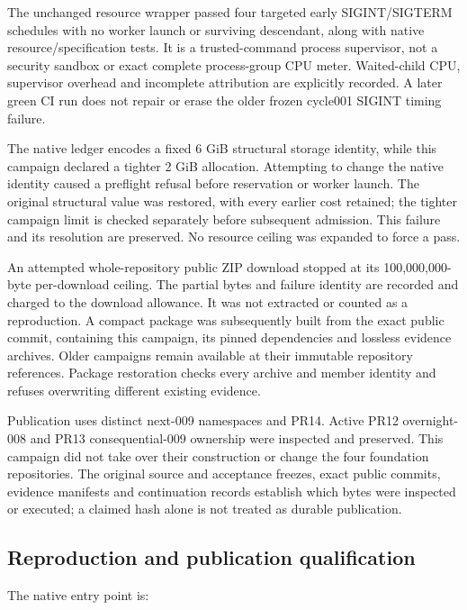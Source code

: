\documentclass[
  11pt,
]{article}
\begin{document}
The unchanged resource wrapper passed four targeted early SIGINT/SIGTERM
schedules with no worker launch or surviving descendant, along with
native resource/specification tests. It is a trusted-command process
supervisor, not a security sandbox or exact complete process-group CPU
meter. Waited-child CPU, supervisor overhead and incomplete attribution
are explicitly recorded. A later green CI run does not repair or erase
the older frozen cycle001 SIGINT timing failure.

The native ledger encodes a fixed 6 GiB structural storage identity,
while this campaign declared a tighter 2 GiB allocation. Attempting to
change the native identity caused a preflight refusal before reservation
or worker launch. The original structural value was restored, with every
earlier cost retained; the tighter campaign limit is checked separately
before subsequent admission. This failure and its resolution are
preserved. No resource ceiling was expanded to force a pass.

An attempted whole-repository public ZIP download stopped at its
100,000,000-byte per-download ceiling. The partial bytes and failure
identity are recorded and charged to the download allowance. It was not
extracted or counted as a reproduction. A compact package was
subsequently built from the exact public commit, containing this
campaign, its pinned dependencies and lossless evidence archives. Older
campaigns remain available at their immutable repository references.
Package restoration checks every archive and member identity and refuses
overwriting different existing evidence.

Publication uses distinct next-009 namespaces and PR14. Active PR12
overnight-008 and PR13 consequential-009 ownership were inspected and
preserved. This campaign did not take over their construction or change
the four foundation repositories. The original source and acceptance
freezes, exact public commits, evidence manifests and continuation
records establish which bytes were inspected or executed; a claimed hash
alone is not treated as durable publication.

\hypertarget{reproduction-and-publication-qualification}{%
\subsection{Reproduction and publication
qualification}\label{reproduction-and-publication-qualification}}

The native entry point is:
\end{document}
